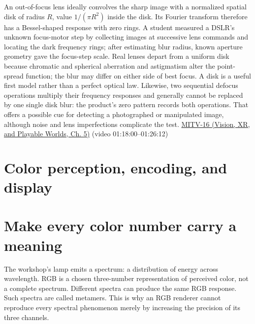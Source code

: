 An out-of-focus lens ideally convolves the sharp image with a normalized spatial disk of radius \(R\), value \(1/(\pi R^2)\) inside the disk. Its Fourier transform therefore has a Bessel-shaped response with zero rings. A student measured a DSLR's unknown focus-motor step by collecting images at successive lens commands and locating the dark frequency rings; after estimating blur radius, known aperture geometry gave the focus-step scale. Real lenses depart from a uniform disk because chromatic and spherical aberration and astigmatism alter the point-spread function; the blur may differ on either side of best focus. A disk is a useful first model rather than a perfect optical law. Likewise, two sequential defocus operations multiply their frequency responses and generally cannot be replaced by one single disk blur: the product's zero pattern records both operations. That offers a possible cue for detecting a photographed or manipulated image, although noise and lens imperfections complicate the test. \href{../07-Vision-XR-and-Playable-Worlds/main.pdf\#nameddest=04-visual-computing-ii-ch036-mitv-16---fast-convolution-low-pass-filter-approximations-integral-images-us-6457032}{MITV-16 (Vision, XR, and Playable Worlds, Ch. 5)} (video 01:18:00--01:26:12)

\section{Color perception, encoding, and display}\label{03-visual-computing-i-ch004-color-perception-encoding-and-display}

\hypertarget{03-visual-computing-i-ch004-color-perception-encoding-and-display}{}

\section{Make every color number carry a meaning}\label{03-visual-computing-i-ch004-make-every-color-number-carry-a-meaning}

\hypertarget{03-visual-computing-i-ch004-make-every-color-number-carry-a-meaning}{}

The workshop's lamp emits a spectrum: a distribution of energy across wavelength. RGB is a chosen three-number representation of perceived color, not a complete spectrum. Different spectra can produce the same RGB response. Such spectra are called metamers. This is why an RGB renderer cannot reproduce every spectral phenomenon merely by increasing the precision of its three channels.

